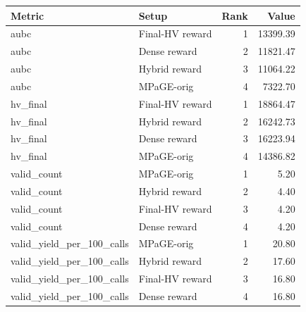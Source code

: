 \begin{tabular}{llrr}
\toprule
Metric & Setup & Rank & Value \\
\midrule
aubc & Final-HV reward & 1 & 13399.39 \\
aubc & Dense reward & 2 & 11821.47 \\
aubc & Hybrid reward & 3 & 11064.22 \\
aubc & MPaGE-orig & 4 & 7322.70 \\
hv_final & Final-HV reward & 1 & 18864.47 \\
hv_final & Hybrid reward & 2 & 16242.73 \\
hv_final & Dense reward & 3 & 16223.94 \\
hv_final & MPaGE-orig & 4 & 14386.82 \\
valid_count & MPaGE-orig & 1 & 5.20 \\
valid_count & Hybrid reward & 2 & 4.40 \\
valid_count & Final-HV reward & 3 & 4.20 \\
valid_count & Dense reward & 4 & 4.20 \\
valid_yield_per_100_calls & MPaGE-orig & 1 & 20.80 \\
valid_yield_per_100_calls & Hybrid reward & 2 & 17.60 \\
valid_yield_per_100_calls & Final-HV reward & 3 & 16.80 \\
valid_yield_per_100_calls & Dense reward & 4 & 16.80 \\
\bottomrule
\end{tabular}
